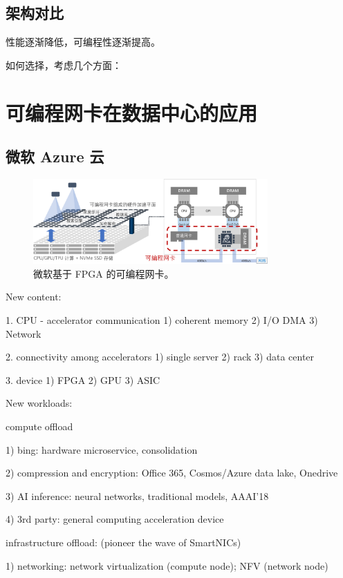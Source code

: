 \subsection{架构对比}
\label{smartnic-comparison}

性能逐渐降低，可编程性逐渐提高。

如何选择，考虑几个方面：

\section{可编程网卡在数据中心的应用}
\label{background:sec:application}


\subsection{微软 Azure 云}

\begin{figure}[htbp]
	\centering
	\includegraphics[width=0.8\textwidth]{figures/azure_fpga.pdf}
	\caption{微软基于 FPGA 的可编程网卡。}
	\label{background:fig:azure_fpga}
\end{figure}


New content:

1. CPU - accelerator communication
1) coherent memory
2) I/O DMA
3) Network

2. connectivity among accelerators
1) single server
2) rack
3) data center

3. device
1) FPGA
2) GPU
3) ASIC

New workloads:

compute offload

1) bing: hardware microservice, consolidation

2) compression and encryption: Office 365, Cosmos/Azure data lake, Onedrive

3) AI inference: neural networks, traditional models, AAAI'18

4) 3rd party: general computing acceleration device

infrastructure offload: (pioneer the wave of SmartNICs)

1) networking: network virtualization (compute node); NFV (network node)

